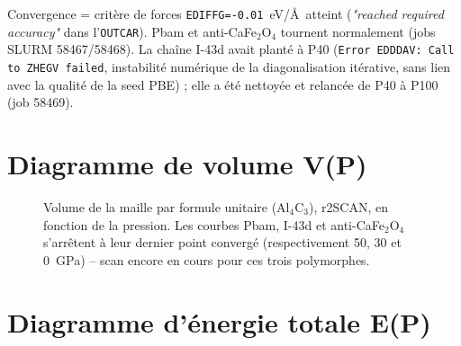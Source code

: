 \documentclass[11pt,a4paper]{article}
\begin{document}
Convergence = critère de forces \texttt{EDIFFG=-0.01}~eV/\AA\ atteint (\emph{"reached required
accuracy"} dans l'\texttt{OUTCAR}). Pbam et anti-CaFe$_2$O$_4$ tournent normalement (jobs SLURM
58467/58468). La chaîne I-43d avait planté à P40 (\texttt{Error EDDDAV: Call to ZHEGV failed},
instabilité numérique de la diagonalisation itérative, sans lien avec la qualité de la seed
PBE) ; elle a été nettoyée et relancée de P40 à P100 (job 58469).

\section{Diagramme de volume V(P)}

\begin{figure}[h]
\centering
{}
\caption{Volume de la maille par formule unitaire (Al$_4$C$_3$), r2SCAN, en fonction de la
pression. Les courbes Pbam, I-43d et anti-CaFe$_2$O$_4$ s'arrêtent à leur dernier point
convergé (respectivement 50, 30 et 0~GPa) -- scan encore en cours pour ces trois polymorphes.}
\label{fig:vp_r2scan}
\end{figure}

\section{Diagramme d'énergie totale E(P)}
\end{document}
